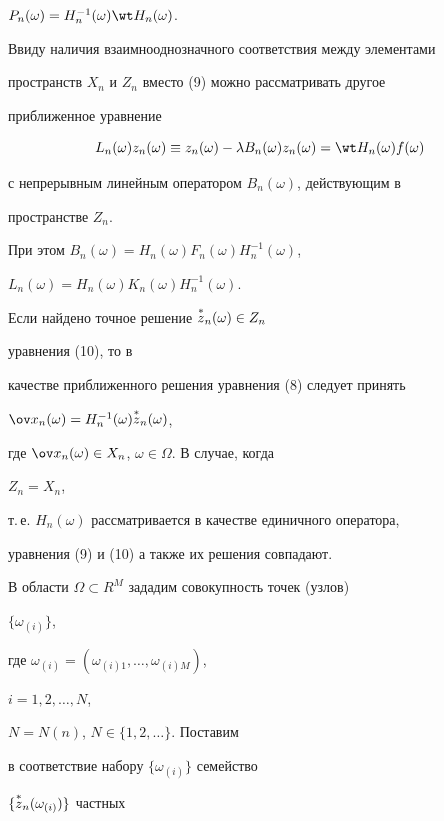 $P_n(\omega)=H^{-1}_n(\omega)\wt H_n(\omega)$.





Ввиду наличия взаимнооднозначного соответствия между элементами


пространств $X_n$ и $Z_n$ вместо (9) можно рассматривать другое


приближенное уравнение


\begin{equation}


L_n(\omega)z_n(\omega)\equiv z_n(\omega)-\lambda B_n(\omega)


z_n(\omega)=\wt H_n(\omega)f(\omega)


\end{equation}


с непрерывным линейным оператором $B_n(\omega)$, действующим в


пространстве $Z_n$.


При этом $B_n(\omega)=H_n(\omega)F_n(\omega)H^{-1}_n(\omega)$,


$L_n(\omega)=H_n(\omega)K_n(\omega)H^{-1}_n(\omega)$.





Если найдено точное решение $\overset{*}{z}{}_n(\omega)\in Z_n$


уравнения (10), то в


качестве приближенного решения уравнения (8) следует принять


$\ov x_n(\omega)=H^{-1}_n(\omega)\up{*}{z}_n(\omega)$,


где $\ov x_n(\omega)\in X_n$, $\omega\in\Omega$. В случае, когда


$Z_n=X_n$,


т.\,е. $H_n(\omega)$ рассматривается в качестве единичного оператора,


уравнения (9) и (10) а также их решения совпадают.





В области $\Omega\subset R^M$ зададим совокупность точек (узлов)


$\{\omega_{(i)}\}$,


где $\omega_{(i)}=(\omega_{(i)1},\dotsc,\omega_{(i)M})$,


$i=1,2,\dotsc,N$,


$N=N(n)$, $N\in\{1,2,\dotsc\}$. Поставим


в соответствие набору $\{\omega_{(i)}\}$ семейство


$\{\overset{*}{z}{}_n(\omega_{(i)})\}$ частных


